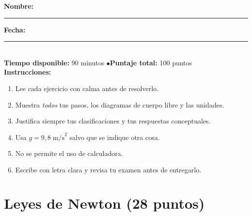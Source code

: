\documentclass[12pt, letterpaper]{article}
\begin{document}


\vspace{4pt}
\begin{cuadroinfo}
  \small
  \textbf{Nombre:} \rule{0.55\linewidth}{0.4pt} \quad \textbf{Fecha:} \rule{0.15\linewidth}{0.4pt} \\[6pt]
  \textbf{Tiempo disponible:} 90 minutos \quad$\bullet$\quad \textbf{Puntaje total:} 100 puntos \\[4pt]
  \textbf{Instrucciones:}
  \begin{enumerate}[leftmargin=*]
    \item Lee cada ejercicio con calma antes de resolverlo.
    \item Muestra \emph{todos} tus pasos, los diagramas de cuerpo libre y las unidades.
    \item Justifica siempre tus clasificaciones y tus respuestas conceptuales.
    \item Usa $g = 9{,}8\;\text{m/s}^2$ salvo que se indique otra cosa.
    \item No se permite el uso de calculadora.
    \item Escribe con letra clara y revisa tu examen antes de entregarlo.
  \end{enumerate}
\end{cuadroinfo}

\vspace{8pt}

\section{Leyes de Newton (28 puntos)}
\end{document}
